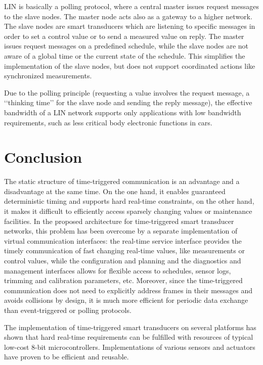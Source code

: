 \documentclass[11pt,a4paper,]{article}
\def\lqq{\lq\lq}
\def\rqq{\rq\rq}
\def\dq#1{\lqq #1\rqq}
\begin{document}
LIN is basically a polling protocol, where a central master issues
request messages to the slave nodes. The master node acts also as
a gateway to a higher network. The slave nodes are smart
transducers which are listening to specific messages in order to
set a control value or to send a measured value on reply. The
master issues request messages on a predefined schedule, while the
slave nodes are not aware of a global time or the current state of
the schedule. This simplifies the implementation of the slave
nodes, but does not support coordinated actions like synchronized
measurements.

Due to the polling principle (requesting a value involves the
request message, a \dq{thinking time} for the slave node and sending
the reply message), the effective bandwidth of a \ac{LIN} network
supports only applications with low bandwidth requirements, such as
less critical body electronic functions in cars.


\section{Conclusion} \label{sec:conclusion}

The static structure of time-triggered communication is an
advantage and a disadvantage at the same time. On the one hand, it
enables guaranteed deterministic timing and supports hard
real-time constraints, on the other hand, it makes it difficult to
efficiently access sparsely changing values or maintenance
facilities. In the proposed architecture for time-triggered smart
transducer networks, this problem has been overcome by a separate
implementation of virtual communication interfaces: the real-time
service interface provides the timely communication of fast
changing real-time values, like measurements or control values,
while the configuration and planning and the diagnostics and
management interfaces allows for flexible access to schedules,
sensor logs, trimming and calibration parameters, etc. Moreover,
since the time-triggered communication does not need to explicitly
address frames in their messages and avoids collisions by design,
it is much more efficient for periodic data exchange than
event-triggered or polling protocols.

The implementation of time-triggered smart transducers on several
platforms has shown that hard real-time requirements can be
fulfilled with resources of typical low-cost 8-bit
microcontrollers. Implementations of various sensors and actuators
have proven to be efficient and reusable.
\end{document}
